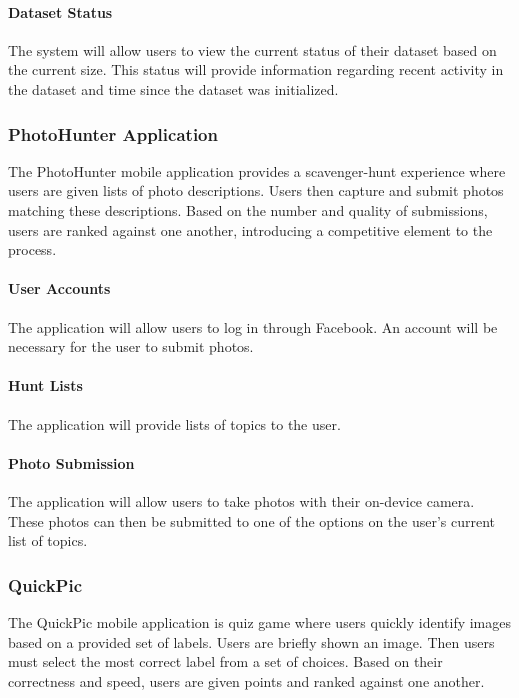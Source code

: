 \documentclass{article}
\begin{document}
  \paragraph{Dataset Status}
  The system will allow users to view the current status of their dataset based
  on the current size. This status will provide information regarding recent
  activity in the dataset and time since the dataset was initialized.

\subsubsection{PhotoHunter Application}
The PhotoHunter mobile application provides a scavenger-hunt experience where
users are given lists of photo descriptions. Users then capture and submit
photos matching these descriptions. Based on the number and quality of
submissions, users are ranked against one another, introducing a competitive
element to the process.

  \paragraph{User Accounts}
  The application will allow users to log in through Facebook. An account will
  be necessary for the user to submit photos.

  \paragraph{Hunt Lists}
  The application will provide lists of topics to the user.

  \paragraph{Photo Submission}
  The application will allow users to take photos with their on-device camera.
  These photos can then be submitted to one of the options on the user's current
  list of topics.

\subsubsection{QuickPic}
The QuickPic mobile application is quiz game where users quickly identify
images based on a provided set of labels. Users are briefly shown an image.
Then users must select the most correct label from a set of choices. Based on
their correctness and speed, users are given points and ranked against one
another.
\end{document}
